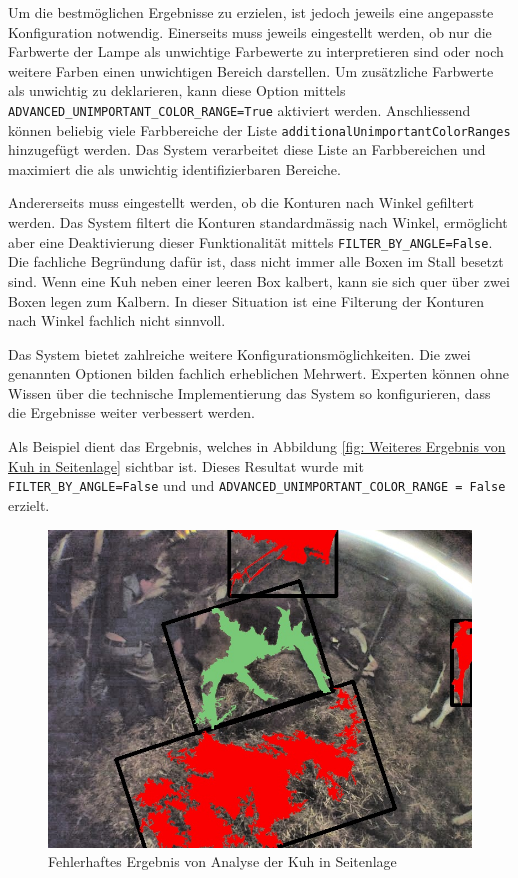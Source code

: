 Um die bestmöglichen Ergebnisse zu erzielen, ist jedoch jeweils eine angepasste Konfiguration notwendig.
Einerseits muss jeweils eingestellt werden, ob nur die Farbwerte der Lampe als unwichtige Farbewerte zu interpretieren sind oder noch weitere Farben einen unwichtigen Bereich darstellen. Um zusätzliche Farbwerte als unwichtig zu deklarieren, kann diese Option mittels \texttt{ADVANCED_UNIMPORTANT_COLOR_RANGE=True} aktiviert werden. Anschliessend können beliebig viele Farbbereiche der Liste \texttt{additionalUnimportantColorRanges} hinzugefügt werden. Das System verarbeitet diese Liste an Farbbereichen und maximiert die als unwichtig identifizierbaren Bereiche.

Andererseits muss eingestellt werden, ob die Konturen nach Winkel gefiltert werden. Das System filtert die Konturen standardmässig nach Winkel, ermöglicht aber eine Deaktivierung dieser Funktionalität mittels \texttt{FILTER_BY_ANGLE=False}. Die fachliche Begründung dafür ist, dass nicht immer alle Boxen im Stall besetzt sind. Wenn eine Kuh neben einer leeren Box kalbert, kann sie sich quer über zwei Boxen legen zum Kalbern. In dieser Situation ist eine Filterung der Konturen nach Winkel fachlich nicht sinnvoll.

Das System bietet zahlreiche weitere Konfigurationsmöglichkeiten. Die zwei genannten Optionen bilden fachlich  erheblichen Mehrwert. Experten können ohne Wissen über die technische Implementierung das System so konfigurieren, dass die Ergebnisse weiter verbessert werden. 

Als Beispiel dient das Ergebnis, welches in Abbildung \ref{fig: Weiteres Ergebnis von Kuh in Seitenlage} sichtbar ist. Dieses Resultat wurde mit \texttt{FILTER_BY_ANGLE=False} und und \texttt{ADVANCED_UNIMPORTANT_COLOR_RANGE = False} erzielt. 
\begin{figure}[H]
	\center
	\includegraphics[scale=0.5]{Grafiken/resultate/resultatFehlerhaft.jpg}
	\caption{Fehlerhaftes Ergebnis von Analyse der Kuh in Seitenlage} 
	\label{fig: Fehlerhaftes Ergebnis von Analyse der Kuh in Seitenlage} 
\end{figure}

